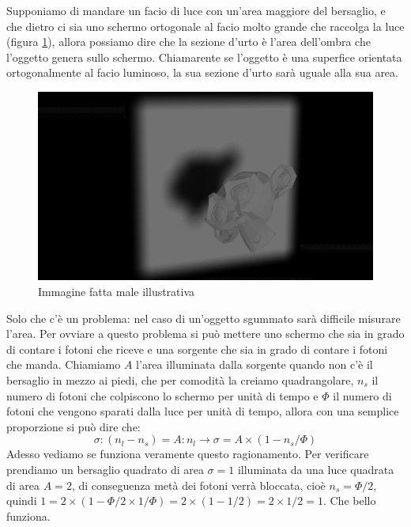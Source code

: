 \documentclass[11pt,a4paper]{article}
\begin{document}
		Supponiamo di mandare un facio di luce con un'area maggiore del bersaglio, e che dietro ci sia uno schermo ortogonale al facio molto grande che raccolga la luce (figura \ref{fig:ombra}), allora possiamo dire che la sezione d'urto è l'area dell'ombra che l'oggetto genera sullo schermo.\newline
		Chiamarente se l'oggetto è una superfice orientata ortogonalmente al facio luminoso, la sua sezione d'urto sarà uguale alla sua area.\newline
		\begin{figure}
			\centering
    		\includegraphics[width=\linewidth]{Immagini/ombra_con_blender.png}
    		\caption{Immagine fatta male illustrativa}
    		\label{fig:ombra}
		\end{figure}

		Solo che c'è un problema: nel caso di un'oggetto sgummato sarà difficile misurare l'area. Per ovviare a questo problema si può mettere uno schermo che sia in grado di contare i fotoni che riceve e una sorgente che sia in grado di contare i fotoni che manda.\newline
		Chiamiamo $A$ l'area illuminata dalla sorgente quando non c'è il bersaglio in mezzo ai piedi, che per comodità la creiamo quadrangolare, $n_s$ il numero di fotoni che colpiscono lo schermo per unità di tempo e $\Phi$ il numero di fotoni che vengono sparati dalla luce per unità di tempo, allora con una semplice proporzione si può dire che:
		\begin{equation}
			\sigma:(n_l-n_s)=A:n_l \rightarrow \sigma=A\times(1-n_s/\Phi)
			\label{eq:sigma_luce}
		\end{equation}
		Adesso vediamo se funziona veramente questo ragionamento.\newline
		Per verificare prendiamo un bersaglio quadrato di area $\sigma=1$ illuminata da una luce quadrata di area $A=2$, di conseguenza metà dei fotoni verrà bloccata, cioè $n_s=\Phi/2$, quindi $1=2\times(1-\Phi/2\times 1/\Phi)=2\times(1-1/2)=2\times 1/2=1$.\newline
		Che bello funziona.\newline
\end{document}

